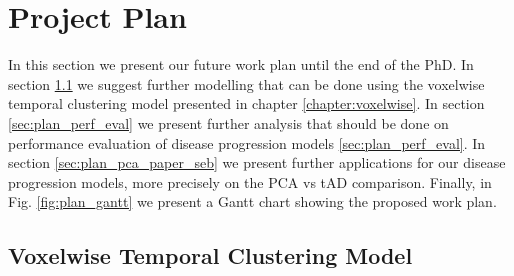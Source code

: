 \chapter{Project Plan}
\label{chapter:plan}

In this section we present our future work plan until the end of the PhD. In section \ref{sec:plan_vox} we suggest further modelling that can be done using the voxelwise temporal clustering model presented in chapter \ref{chapter:voxelwise}. In section \ref{sec:plan_perf_eval} we present further analysis that should be done on performance evaluation of disease progression models \ref{sec:plan_perf_eval}. In section \ref{sec:plan_pca_paper_seb} we present further applications for our disease progression models, more precisely on the PCA vs tAD comparison. Finally, in Fig. \ref{fig:plan_gantt} we present a Gantt chart showing the proposed work plan.

\section{Voxelwise Temporal Clustering Model}
\label{sec:plan_vox}

